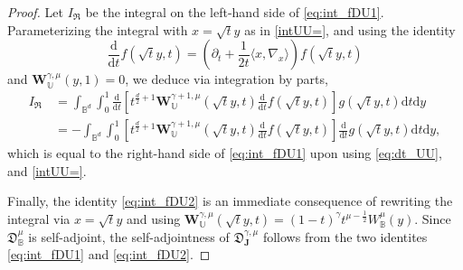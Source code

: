 \documentclass[10pt,a4paper]{amsart}
\def\BB{{\mathbb B}}
\def\Jb{{\mathbf J}}
\def\UU{{\mathbb U}}
\def\Wb{{\mathbf W}}
\def\d{\mathrm{d}}
\def\f{\frac}
\def\fD{{\mathfrak D}}
\def\fR{{\mathfrak R}}
\def\g{{\gamma}}
\def\la{{\langle}}
\def\ra{{\rangle}}
\begin{document}
\begin{proof}
Let $I_\fR$ be the integral on the left-hand side of \eqref{eq:int_fDU1}. Parameterizing the integral with $x = \sqrt{t} y$
as in \eqref{intUU=}, and using the identity
\begin{equation}\label{eq:dt_UU}
   \frac{\d}{\d t} f\left(\sqrt{t} y, t\right ) = \left(\partial_t + \frac{1}{2t} \la x, \nabla_x \ra \right) f\left(\sqrt{t} y, t\right )
\end{equation}
and $\Wb_\UU^{\g,\mu}(y, 1) = 0$, we deduce via integration by parts, 
\begin{align*}
  I_{\fR}\,& = \int_{\BB^d} \int_0^1 \frac{\d} {\d t} \left[ t^{\frac{d}{2}+1} \Wb_\UU^{\g+1,\mu}\left(\sqrt{t} y, t\right) 
     \frac{\d} {\d t}f\left(\sqrt{t} y, t\right ) \right] g \left(\sqrt{t} y, t\right ) \d t \d y \\
     & = - \int_{\BB^d} \int_0^1\left[ t^{\frac{d}{2}+1} \Wb_\UU^{\g+1,\mu}\left(\sqrt{t} y, t\right) 
   \frac{\d} {\d t}  f\left(\sqrt{t} y, t\right ) \right]   \frac{\d} {\d t} g \left(\sqrt{t} y, t\right ) \d t \d y,
\end{align*} 
which is equal to the right-hand side of \eqref{eq:int_fDU1} upon using \eqref{eq:dt_UU}, and \eqref{intUU=}. 

Finally, the identity \eqref{eq:int_fDU2} is an immediate consequence of rewriting the integral via $x = \sqrt{t} y$
and using $\Wb_\UU^{\g,\mu} (\sqrt{t} y, t) = (1-t)^\g t^{\mu-\f12} W_\BB^\mu (y)$. Since $\fD_\BB^\mu$ is self-adjoint,
the self-adjointness of $\fD_\Jb^{\g,\mu}$ follows from the two identites \eqref{eq:int_fDU1} and \eqref{eq:int_fDU2}. 
\end{proof}
\end{document}
